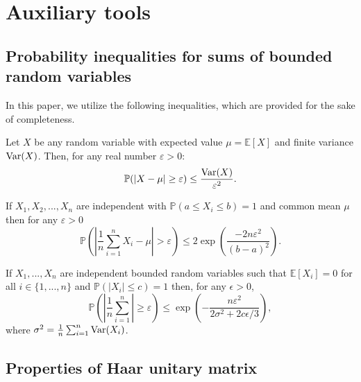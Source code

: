 \section{Auxiliary tools}

\subsection{Probability inequalities for sums of bounded random variables}

In this paper, we utilize the following inequalities, which are provided for the sake of completeness.

\begin{theorem}
    Let $X$ be any random variable with expected value $\mu =\mathbb{E}[X]$ and finite variance $\mathrm{Var}(X)$. Then, for any real number $\varepsilon >0$:
    \begin{equation}
        \mathbb{P}(|X -\mu| \geq \varepsilon) \leq \frac{\mathrm{Var}(X)}{\varepsilon^2}.
    \end{equation}
\end{theorem}

\begin{theorem}
     If $X_1, X_2, ...,X_n$ are independent with $\mathbb{P}(a \leq X_i \leq b) = 1$ and common mean $\mu$ then for any $\varepsilon > 0$ 
    \begin{equation}
        \mathbb{P}\left( \left|\frac{1}{n} \sum_{i=1}^n X_i - \mu\right| > \varepsilon\right) \leq 2 \exp\left(\frac{-2n\varepsilon^2}{(b-a)^2}\right).
    \end{equation}
\end{theorem}

\begin{theorem}
    If $X_1,...,X_n$ are independent bounded random variables such that $\mathbb{E}[X_i] = 0$ for all $i \in \{1,...,n\}$ and $\mathbb{P}(|X_i| \leq c) =1$ then, for any $\epsilon>0$,
    \begin{equation}
        \mathbb{P}\left(\left|\frac{1}{n}\sum_{i=1}^n \right| \geq \varepsilon\right) \leq \exp\left(-\frac{n\varepsilon^2}{2 \sigma^2 + 2c\epsilon /3}\right),
    \end{equation}
    where $\sigma^2 = \frac{1}{n}\sum_{i=1}^n \mathrm{Var}(X_i)$.
\end{theorem}

\subsection{Properties of Haar unitary matrix}

